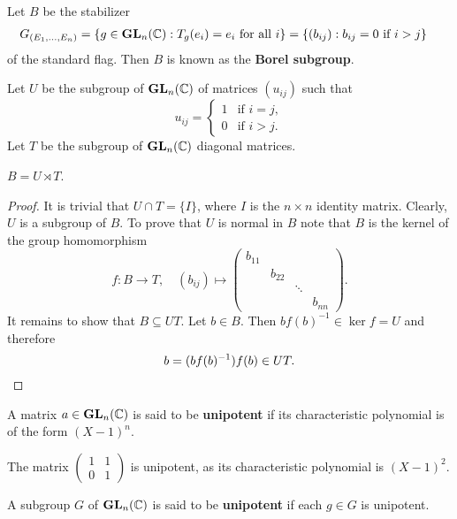 \label{Borel subgroup}
Let $B$ be the stabilizer    
\begin{align*}
G_{(E_1,\dots,E_n)}
&=\{g\in\mathbf{GL}_n(\mathbb{C}):T_g(e_i)=e_i\text{ for all $i$}\}
=\{(b_{ij}):b_{ij}=0\text{ if $i>j$}\}
\end{align*}
of the standard flag. Then $B$ is 
known as the \textbf{Borel subgroup}. 

Let $U$ be the subgroup of $\mathbf{GL}_n(\mathbb{C})$ 
of matrices $(u_{ij})$ such that 
\[
u_{ij}=\begin{cases}
1&\text{if $i=j$},\\
0&\text{if $i>j$}.\end{cases}
\]
Let $T$ be the subgroup of $\mathbf{GL}_n(\mathbb{C})$ diagonal matrices. 

\begin{proposition}
    $B=U\rtimes T$. 
\end{proposition}

\begin{proof}
    It is trivial that $U\cap T=\{I\}$, where $I$ is the 
    $n\times n$ identity matrix. Clearly, $U$ is a subgroup of $B$.
    To prove that 
    $U$ is normal in $B$ note that $B$ is the kernel
    of the group homomorphism
    \[
    f\colon B\to T,\quad
    (b_{ij})\mapsto\begin{pmatrix}
        b_{11}\\
        &b_{22}\\
        &&\ddots\\
        &&&b_{nn}
    \end{pmatrix}.
    \]
    It remains to show that $B\subseteq UT$. Let $b\in B$. Then
    $bf(b)^{-1}\in \ker f=U$ and therefore  
    \[
    b=(bf(b)^{-1})f(b)\in UT.\qedhere
    \]
\end{proof}

\begin{definition}
    A matrix $a\in\mathbf{GL}_n(\mathbb{C})$ is said to be \textbf{unipotent} 
    if its characteristic polynomial is of the form 
    $(X-1)^n$. 
\end{definition}

The matrix $\begin{pmatrix}1&1\\0&1\end{pmatrix}$ is unipotent, 
as its characteristic polynomial is $(X-1)^2$. 

\begin{definition}
    A subgroup $G$ of $\mathbf{GL}_n(\mathbb{C})$ is said to be \textbf{unipotent} if
    each $g\in G$ is unipotent. 
\end{definition}

